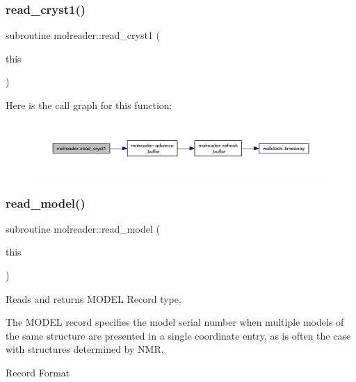 \subsubsection{\texorpdfstring{read\+\_\+cryst1()}{read\_cryst1()}}
{\footnotesize\ttfamily subroutine molreader\+::read\+\_\+cryst1 (\begin{DoxyParamCaption}\item[{type(\hyperlink{structmolreader_1_1cryst1}{cryst1}), intent(inout)}]{this }\end{DoxyParamCaption})\hspace{0.3cm}{\ttfamily [private]}}

Here is the call graph for this function\+:\nopagebreak
\begin{figure}[H]
\begin{center}
\leavevmode
\includegraphics[width=350pt]{namespacemolreader_af85c1b386f0dc78ebf55e003b4f8c83a_cgraph}
\end{center}
\end{figure}
\mbox{\label{namespacemolreader_a64ff990dc05c01debc1138dd012f4bcb}} 
\subsubsection{\texorpdfstring{read\+\_\+model()}{read\_model()}}
{\footnotesize\ttfamily subroutine molreader\+::read\+\_\+model (\begin{DoxyParamCaption}\item[{type(\hyperlink{structmolreader_1_1model}{model}), intent(inout)}]{this }\end{DoxyParamCaption})\hspace{0.3cm}{\ttfamily [private]}}



Reads and returns M\+O\+D\+EL Record type. 

The M\+O\+D\+EL record specifies the model serial number when multiple models of the same structure are presented in a single coordinate entry, as is often the case with structures determined by N\+MR.

Record Format

